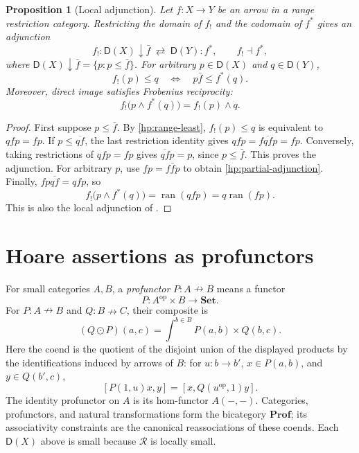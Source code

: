\documentclass[11pt]{article}
\newtheorem{proposition}[theorem]{Proposition}
\theoremstyle{definition}
\theoremstyle{remark}
\newcommand{\R}{\mathscr R}
\newcommand{\D}{\mathsf D}
\newcommand{\ran}{\operatorname{ran}}
\newcommand{\Set}{\mathbf{Set}}
\newcommand{\Prof}{\mathbf{Prof}}
\newcommand{\op}{\mathrm{op}}
\begin{document}
\begin{proposition}[Local adjunction]\label{hp:local-adjunction}
Let $f:X\to Y$ be an arrow in a range restriction category. Restricting
the domain of $f_!$ and the codomain of $f^*$ gives an adjunction
\[
 f_!:\D(X)\mathbin{\downarrow}\bar f
 \ \rightleftarrows\ \D(Y):f^*,\qquad f_!\dashv f^*,
\]
where $\D(X)\mathbin{\downarrow}\bar f=\{p:p\le\bar f\}$.
For arbitrary $p\in\D(X)$ and $q\in\D(Y)$,
\begin{equation}\label{hp:partial-adjunction}
 f_!(p)\le q\quad\Longleftrightarrow\quad
 p\bar f\le f^*(q).
\end{equation}
Moreover, direct image satisfies Frobenius reciprocity:
\begin{equation}\label{hp:frobenius}
 f_!\bigl(p\wedge f^*(q)\bigr)=f_!(p)\wedge q.
\end{equation}
\end{proposition}
\begin{proof}
First suppose $p\le\bar f$. By \eqref{hp:range-least},
$f_!(p)\le q$ is equivalent to $qfp=fp$. If $p\le\overline{qf}$,
the last restriction identity gives $qfp=f\overline{qf}p=fp$.
Conversely, taking restrictions of $qfp=fp$ gives
$\overline{qf}p=p$, since $p\le\bar f$. This proves the adjunction.
For arbitrary $p$, use $fp=f\bar f p$ to obtain
\eqref{hp:partial-adjunction}. Finally,
$fp\overline{qf}=qfp$, so
\[
 f_!\bigl(p\wedge f^*(q)\bigr)
 =\ran(qfp)=q\ran(fp).
\]
This is also the local adjunction of
\cite[Proposition~8.2]{CockettGarner}.
\end{proof}

\section{Hoare assertions as profunctors}\label{hp:profunctors}

For small categories $A,B$, a \emph{profunctor} $P:A\nrightarrow B$
means a functor
\[
 P:A^{\op}\times B\longrightarrow\Set.
\]
For $P:A\nrightarrow B$ and $Q:B\nrightarrow C$, their composite is
\[
 (Q\odot P)(a,c)=\int^{b\in B}P(a,b)\times Q(b,c).
\]
Here the coend is the quotient of the disjoint union of the displayed
products by the identifications induced by arrows of $B$: for
$u:b\to b'$, $x\in P(a,b)$, and $y\in Q(b',c)$,
\[
 [P(1,u)x,y]=[x,Q(u^{\op},1)y].
\]
The identity profunctor on $A$ is its hom-functor $A(-,-)$.
Categories, profunctors, and natural transformations form the bicategory
$\Prof$; its associativity constraints are the canonical reassociations
of these coends. Each $\D(X)$ above is small because $\R$ is locally
small.
\end{document}
